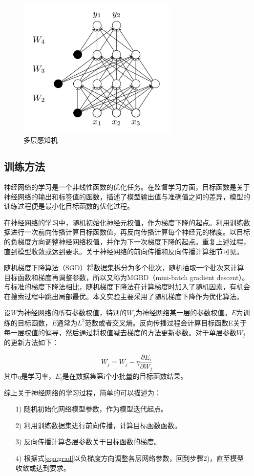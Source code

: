 \documentclass[zihao = -4,cn]{oucart}
\begin{document}
\begin{figure}[h]
	\centering %
	\includegraphics[width=8cm,height=7cm]{assets/MLP}
	\caption{多层感知机}
	\label{fig:MLP}
\end{figure}

\subsection{训练方法}
神经网络的学习是一个非线性函数的优化任务。在监督学习方面，目标函数是关于神经网络的输出和标签值的函数，描述了模型输出值与准确值之间的差异，模型的训练过程便是最小化目标函数的优化过程。\par
在神经网络的学习中，随机初始化神经元权值，作为梯度下降的起点。利用训练数据进行一次前向传播计算目标函数值，再反向传播计算每个神经元的梯度。以目标的负梯度方向调整神经网络权值，并作为下一次梯度下降的起点。重复上述过程，直到模型收敛或达到要求。关于神经网络的前向传播和反向传播计算细节可见\cite{周志华2016机器学习}。\par
随机梯度下降算法（SGD）将数据集拆分为多个批次，随机抽取一个批次来计算目标函数和梯度再调整参数，所以又称为MGBD（mini-batch gradient descent）。与标准的梯度下降法相比，随机梯度下降法在计算梯度时加入了随机因素，有机会在搜索过程中跳出局部最优。本文实验主要采用了随机梯度下降作为优化算法。\par
设$W$为神经网络的所有参数权值，特别的$W_j$为神经网络某一层的参数权值。$E$为训练的目标函数，$E$通常为$L^2$范数或者交叉熵\cite{murphy2012machine}。反向传播过程会计算目标函数E关于每一层权值的偏导，然后通过将权值减去梯度的方法更新参数。对于单层参数$W_j$的更新方法如下：\par
\begin{equation}
W_j = W_j - \eta \frac{\partial E_i}{\partial W_j} \label{eqa:grad}
\end{equation}
其中$\eta$是学习率，$E_i$是在数据集第i个小批量的目标函数结果。\par
综上关于神经网络的学习过程，简单的可以描述为：
\begin{itemize}
	\item [1)]
	随机初始化网络模型参数，作为模型迭代起点。
	\item [2)]
	利用训练数据集进行前向传播，计算目标函数函数。
	\item [3)]
	反向传播计算各层参数关于目标函数的梯度。
	\item [4)]
	根据式\ref{eqa:grad}以负梯度方向调整各层网络参数，回到步骤2)，直至模型收敛或达到要求。
\end{itemize}
\par
\end{document}
